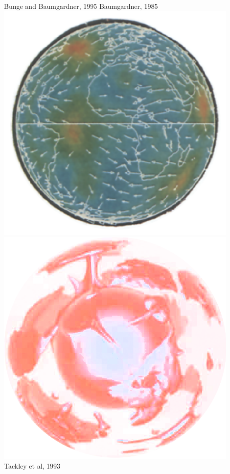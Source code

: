 \documentclass[t,compress=false,usepdftitle=false]{beamer}
\begin{document}
\begin{frame}
\begin{columns}
\begin{columns}
Bunge and Baumgardner, 1995
Baumgardner, 1985\\
\includegraphics[width=0.9\textwidth]{baumgardner85.png}\\
\vspace{2mm}
\includegraphics[width=0.9\textwidth]{tackley93.png}\\
Tackley et al, 1993
\end{columns}
\end{columns}
\end{frame}%
\end{document}
